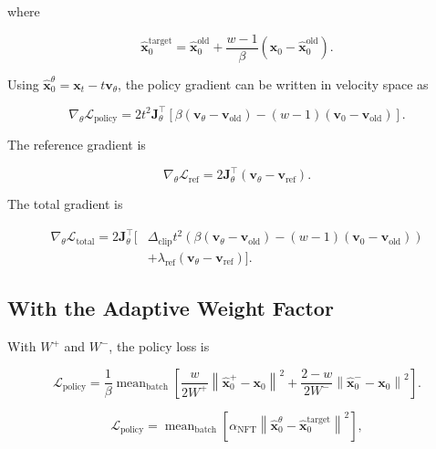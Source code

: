 \documentclass{article} %
\begin{document}
where

\begin{equation}
\hat{\mathbf{x}}_0^{\mathrm{target}}
=
\hat{\mathbf{x}}_0^{\mathrm{old}}
+
\frac{w-1}{\beta}
\left(
\mathbf{x}_0-\hat{\mathbf{x}}_0^{\mathrm{old}}
\right).
\end{equation}

Using
$\hat{\mathbf{x}}_0^\theta=\mathbf{x}_t-t\mathbf{v}_\theta$,
the policy gradient can be written in velocity space as

\begin{equation}
\nabla_\theta\mathcal{L}_{\mathrm{policy}}
=
2t^2\mathbf{J}_{\theta}^\top
\left[
\beta
\left(
\mathbf{v}_\theta-\mathbf{v}_{\mathrm{old}}
\right)
-
(w-1)
\left(
\mathbf{v}_0-\mathbf{v}_{\mathrm{old}}
\right)
\right].
\end{equation}

The reference gradient is

\begin{equation}
\nabla_\theta\mathcal{L}_{\mathrm{ref}}
=
2\mathbf{J}_{\theta}^\top
\left(
\mathbf{v}_\theta-\mathbf{v}_{\mathrm{ref}}
\right).
\end{equation}

The total gradient is

\begin{align}
\nabla_\theta\mathcal{L}_{\mathrm{total}}
=
2\mathbf{J}_{\theta}^\top
\Big[
&
\Delta_{\mathrm{clip}}t^2
\left(
\beta(\mathbf{v}_\theta-\mathbf{v}_{\mathrm{old}})
-
(w-1)(\mathbf{v}_0-\mathbf{v}_{\mathrm{old}})
\right)
\nonumber\\
&+
\lambda_{\mathrm{ref}}
(\mathbf{v}_\theta-\mathbf{v}_{\mathrm{ref}})
\Big].
\end{align}


\subsection{With the Adaptive Weight Factor}

With $W^+$ and $W^-$, the policy loss is

\begin{equation}
\mathcal{L}_{\mathrm{policy}}
=
\frac{1}{\beta}
\operatorname{mean}_{\mathrm{batch}}
\left[
\frac{w}{2W^+}
\left\|
\hat{\mathbf{x}}_0^+-\mathbf{x}_0
\right\|^2
+
\frac{2-w}{2W^-}
\left\|
\hat{\mathbf{x}}_0^--\mathbf{x}_0
\right\|^2
\right].
\end{equation}


\begin{equation}
\mathcal{L}_{\mathrm{policy}}
=
\operatorname{mean}_{\mathrm{batch}}
\left[
\alpha_{\mathrm{NFT}}
\left\|
\hat{\mathbf{x}}_0^\theta
-
\hat{\mathbf{x}}_0^{\mathrm{target}}
\right\|^2
\right],
\end{equation}
\end{document}
